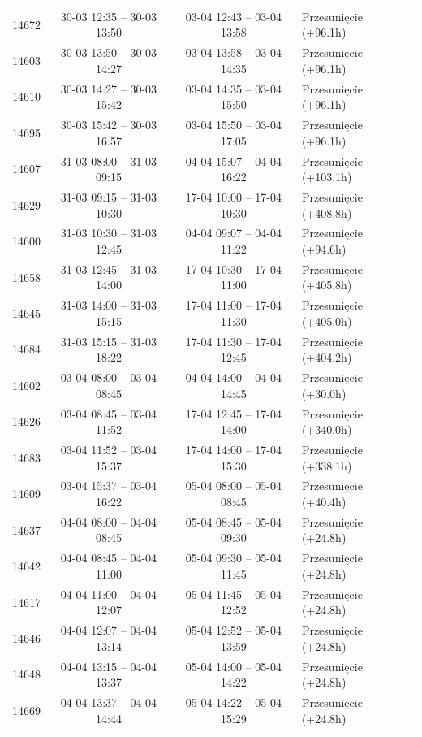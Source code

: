 \begin{table}[htbp]
\begin{tabular}{|r|c|c|l|}
14672 & 30-03 12:35 -- 30-03 13:50 & 03-04 12:43 -- 03-04 13:58 & Przesunięcie (+96.1h) \\ 
14603 & 30-03 13:50 -- 30-03 14:27 & 03-04 13:58 -- 03-04 14:35 & Przesunięcie (+96.1h) \\ 
14610 & 30-03 14:27 -- 30-03 15:42 & 03-04 14:35 -- 03-04 15:50 & Przesunięcie (+96.1h) \\ 
14695 & 30-03 15:42 -- 30-03 16:57 & 03-04 15:50 -- 03-04 17:05 & Przesunięcie (+96.1h) \\ 
14607 & 31-03 08:00 -- 31-03 09:15 & 04-04 15:07 -- 04-04 16:22 & Przesunięcie (+103.1h) \\ 
14629 & 31-03 09:15 -- 31-03 10:30 & 17-04 10:00 -- 17-04 10:30 & Przesunięcie (+408.8h) \\ 
14600 & 31-03 10:30 -- 31-03 12:45 & 04-04 09:07 -- 04-04 11:22 & Przesunięcie (+94.6h) \\ 
14658 & 31-03 12:45 -- 31-03 14:00 & 17-04 10:30 -- 17-04 11:00 & Przesunięcie (+405.8h) \\ 
14645 & 31-03 14:00 -- 31-03 15:15 & 17-04 11:00 -- 17-04 11:30 & Przesunięcie (+405.0h) \\ 
14684 & 31-03 15:15 -- 31-03 18:22 & 17-04 11:30 -- 17-04 12:45 & Przesunięcie (+404.2h) \\ 
14602 & 03-04 08:00 -- 03-04 08:45 & 04-04 14:00 -- 04-04 14:45 & Przesunięcie (+30.0h) \\ 
14626 & 03-04 08:45 -- 03-04 11:52 & 17-04 12:45 -- 17-04 14:00 & Przesunięcie (+340.0h) \\ 
14683 & 03-04 11:52 -- 03-04 15:37 & 17-04 14:00 -- 17-04 15:30 & Przesunięcie (+338.1h) \\ 
14609 & 03-04 15:37 -- 03-04 16:22 & 05-04 08:00 -- 05-04 08:45 & Przesunięcie (+40.4h) \\ 
14637 & 04-04 08:00 -- 04-04 08:45 & 05-04 08:45 -- 05-04 09:30 & Przesunięcie (+24.8h) \\ 
14642 & 04-04 08:45 -- 04-04 11:00 & 05-04 09:30 -- 05-04 11:45 & Przesunięcie (+24.8h) \\ 
14617 & 04-04 11:00 -- 04-04 12:07 & 05-04 11:45 -- 05-04 12:52 & Przesunięcie (+24.8h) \\ 
14646 & 04-04 12:07 -- 04-04 13:14 & 05-04 12:52 -- 05-04 13:59 & Przesunięcie (+24.8h) \\ 
14648 & 04-04 13:15 -- 04-04 13:37 & 05-04 14:00 -- 05-04 14:22 & Przesunięcie (+24.8h) \\ 
14669 & 04-04 13:37 -- 04-04 14:44 & 05-04 14:22 -- 05-04 15:29 & Przesunięcie (+24.8h) \\ 

\end{tabular}
\end{table}
